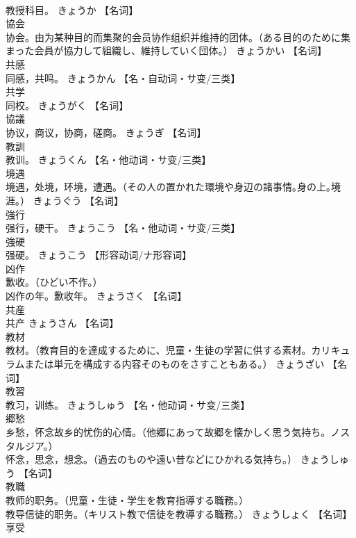 \documentclass[8pt]{extreport}
\begin{document}
\begin{CJK}{UTF8}{min}
\\	教授科目。	きょうか		【名词】
\\	協会	
\\	协会。由为某种目的而集聚的会员协作组织并维持的团体。（ある目的のために集まった会員が協力して組織し、維持していく団体。）	きょうかい		【名词】
\\	共感	
\\	同感，共鸣。	きょうかん		【名・自动词・サ变/三类】
\\	共学	
\\	同校。	きょうがく		【名词】
\\	協議	
\\	协议，商议，协商，磋商。	きょうぎ		【名词】
\\	教訓	
\\	教训。	きょうくん		【名・他动词・サ变/三类】
\\	境遇	
\\	境遇，处境，环境，遭遇。（その人の置かれた環境や身辺の諸事情｡身の上｡境涯｡）	きょうぐう		【名词】
\\	強行	
\\	强行，硬干。	きょうこう		【名・他动词・サ变/三类】
\\	強硬	
\\	强硬。	きょうこう		【形容动词/ナ形容词】
\\	凶作	
\\	歉收。（ひどい不作。） 
\\	凶作の年。歉收年。	きょうさく		【名词】
\\	共産	
\\	共产	きょうさん		【名词】
\\	教材	
\\	教材。（教育目的を達成するために、児童・生徒の学習に供する素材。カリキュラムまたは単元を構成する内容そのものをさすこともある。）	きょうざい		【名词】
\\	教習	
\\	教习，训练。	きょうしゅう		【名・他动词・サ变/三类】
\\	郷愁	
\\	乡愁，怀念故乡的忧伤的心情。（他郷にあって故郷を懐かしく思う気持ち。ノスタルジア。） 
\\	怀念，思念，想念。（過去のものや遠い昔などにひかれる気持ち。）	きょうしゅう		【名词】
\\	教職	
\\	教师的职务。（児童・生徒・学生を教育指導する職務。） 
\\	教导信徒的职务。（キリスト教で信徒を教導する職務。）	きょうしょく		【名词】
\\	享受	

\end{CJK}
\end{document}
